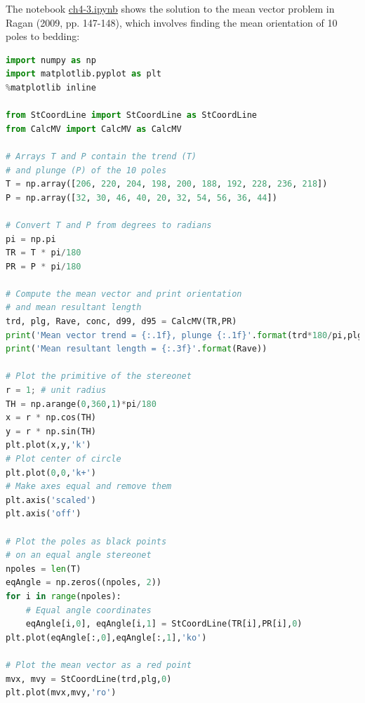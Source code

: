 \documentclass[a4paper , 12pt]{book}
\begin{document}
The notebook \href{http://github.com}{ch4-3.ipynb} shows the solution to the mean vector problem in Ragan (2009, pp. 147-148), which involves finding the mean orientation of 10 poles to bedding:

\begin{center}
\begin{lstlisting}[language=Python, frame=single]
import numpy as np
import matplotlib.pyplot as plt
%matplotlib inline

from StCoordLine import StCoordLine as StCoordLine
from CalcMV import CalcMV as CalcMV 

# Arrays T and P contain the trend (T) 
# and plunge (P) of the 10 poles
T = np.array([206, 220, 204, 198, 200, 188, 192, 228, 236, 218])
P = np.array([32, 30, 46, 40, 20, 32, 54, 56, 36, 44])

# Convert T and P from degrees to radians
pi = np.pi
TR = T * pi/180
PR = P * pi/180

# Compute the mean vector and print orientation
# and mean resultant length
trd, plg, Rave, conc, d99, d95 = CalcMV(TR,PR)
print('Mean vector trend = {:.1f}, plunge {:.1f}'.format(trd*180/pi,plg*180/pi))
print('Mean resultant length = {:.3f}'.format(Rave))

# Plot the primitive of the stereonet
r = 1; # unit radius
TH = np.arange(0,360,1)*pi/180
x = r * np.cos(TH)
y = r * np.sin(TH)
plt.plot(x,y,'k')
# Plot center of circle
plt.plot(0,0,'k+')
# Make axes equal and remove them
plt.axis('scaled')
plt.axis('off')

# Plot the poles as black points
# on an equal angle stereonet
npoles = len(T)
eqAngle = np.zeros((npoles, 2))
for i in range(npoles):
    # Equal angle coordinates
    eqAngle[i,0], eqAngle[i,1] = StCoordLine(TR[i],PR[i],0)
plt.plot(eqAngle[:,0],eqAngle[:,1],'ko')

# Plot the mean vector as a red point
mvx, mvy = StCoordLine(trd,plg,0)
plt.plot(mvx,mvy,'ro')
\end{lstlisting}
\end{center}
\end{document}
